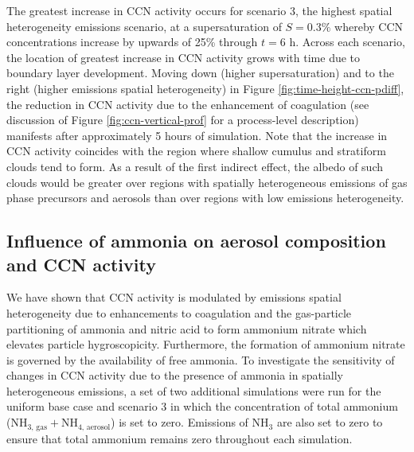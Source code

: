 \documentclass[journal abbreviation, manuscript]{copernicus}
\begin{document}
The greatest increase in CCN activity occurs for scenario 3, the highest spatial heterogeneity emissions scenario, at a supersaturation of $S=0.3\%$ whereby CCN concentrations increase by upwards of 25\% through $t=6$ h. Across each scenario, the location of greatest increase in CCN activity grows with time due to boundary layer development. Moving down (higher supersaturation) and to the right (higher emissions spatial heterogeneity) in Figure \ref{fig:time-height-ccn-pdiff}, the reduction in CCN activity due to the enhancement of coagulation (see discussion of Figure \ref{fig:ccn-vertical-prof} for a process-level description) manifests after approximately 5 hours of simulation. Note that the increase in CCN activity coincides with the region where shallow cumulus and stratiform clouds tend to form. As a result of the first indirect effect, the albedo of such clouds would be greater over regions with spatially heterogeneous emissions of gas phase precursors and aerosols than over regions with low emissions heterogeneity.  



\subsection{Influence of ammonia on aerosol composition and CCN activity}\label{sec:influence-ammonia}

We have shown that CCN activity is modulated by emissions spatial heterogeneity due to enhancements to coagulation and the gas-particle partitioning of ammonia and nitric acid to form ammonium nitrate which elevates particle hygroscopicity. Furthermore, the formation of ammonium nitrate is governed by the availability of free ammonia. To investigate the sensitivity of changes in CCN activity due to the presence of ammonia in spatially heterogeneous emissions, a set of two additional simulations were run for the uniform base case and scenario 3 in which the concentration of total ammonium (NH$_{3\text{, gas}} + $NH$_{4\text{, aerosol}}$) is set to zero. Emissions of NH$_3$ are also set to zero to ensure that total ammonium remains zero throughout each simulation. 
\end{document}
